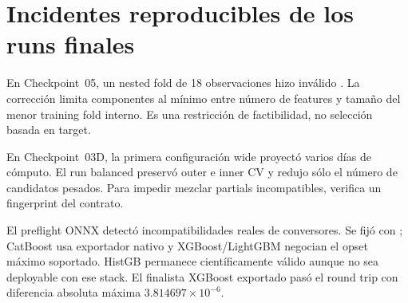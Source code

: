 \section{Incidentes reproducibles de los runs finales}

En Checkpoint~05, un nested fold de 18 observaciones hizo inválido
. La corrección limita componentes al mínimo entre número de
features y tamaño del menor training fold interno. Es una restricción de factibilidad, no
selección basada en target.

En Checkpoint~03D, la primera configuración wide proyectó varios días de cómputo. El run
balanced preservó outer e inner CV y redujo sólo el número de candidatos pesados. Para impedir
mezclar partials incompatibles,  verifica un fingerprint del contrato.

El preflight ONNX detectó incompatibilidades reales de conversores. Se fijó
 con ; CatBoost usa exportador nativo y
XGBoost/LightGBM negocian el opset máximo soportado. HistGB permanece científicamente válido
aunque no sea deployable con ese stack. El finalista XGBoost exportado pasó el round trip con
diferencia absoluta máxima $3.814697\times10^{-6}$.
